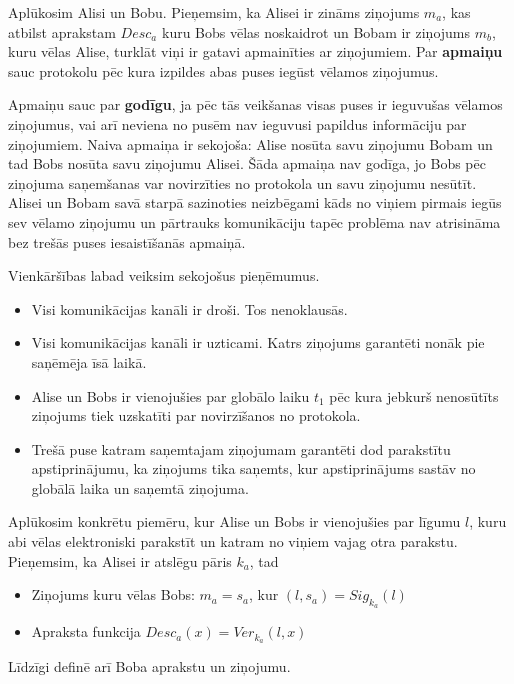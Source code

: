 Aplūkosim Alisi un Bobu. Pieņemsim, ka Alisei ir zināms ziņojums $m_a$, kas atbilst aprakstam $Desc_a$ kuru Bobs vēlas noskaidrot un Bobam ir ziņojums $m_b$, kuru vēlas Alise, turklāt viņi ir gatavi apmainīties ar ziņojumiem. Par \textbf{apmaiņu} sauc protokolu pēc kura izpildes abas puses iegūst vēlamos ziņojumus. 

Apmaiņu sauc par \textbf{godīgu}, ja pēc tās veikšanas visas puses ir ieguvušas vēlamos ziņojumus, vai arī neviena no pusēm nav ieguvusi papildus informāciju par ziņojumiem. Naiva apmaiņa ir sekojoša: Alise nosūta savu ziņojumu Bobam un tad Bobs nosūta savu ziņojumu Alisei. Šāda apmaiņa nav godīga, jo Bobs pēc ziņojuma saņemšanas var novirzīties no protokola un savu ziņojumu nesūtīt. Alisei un Bobam savā starpā sazinoties neizbēgami kāds no viņiem pirmais iegūs sev vēlamo ziņojumu un pārtrauks komunikāciju tapēc problēma nav atrisināma bez trešās puses iesaistīšanās apmaiņā.\cite{pagnia99}

Vienkāršības labad veiksim sekojošus pieņēmumus.
\begin{itemize}
    \item Visi komunikācijas kanāli ir droši. Tos nenoklausās.
    \item Visi komunikācijas kanāli ir uzticami. Katrs ziņojums garantēti nonāk pie saņēmēja īsā laikā.
    \item Alise un Bobs ir vienojušies par globālo laiku $t_1$ pēc kura jebkurš nenosūtīts ziņojums tiek uzskatīti par novirzīšanos no protokola.
    \item Trešā puse katram saņemtajam ziņojumam garantēti dod parakstītu apstiprinājumu, ka ziņojums tika saņemts, kur apstiprinājums sastāv no globālā laika un saņemtā ziņojuma.
\end{itemize}

Aplūkosim konkrētu piemēru, kur Alise un Bobs ir vienojušies par līgumu $l$, kuru abi vēlas elektroniski parakstīt un katram no viņiem vajag otra parakstu. Pieņemsim, ka Alisei ir atslēgu pāris $k_a$, tad
\begin{itemize}
    \item Ziņojums kuru vēlas Bobs: $m_a = s_a$, kur $(l, s_a) = Sig_{k_a}(l)$
    \item Apraksta funkcija $Desc_a(x) = Ver_{k_a}(l, x)$
\end{itemize}
Līdzīgi definē arī Boba aprakstu un ziņojumu.

